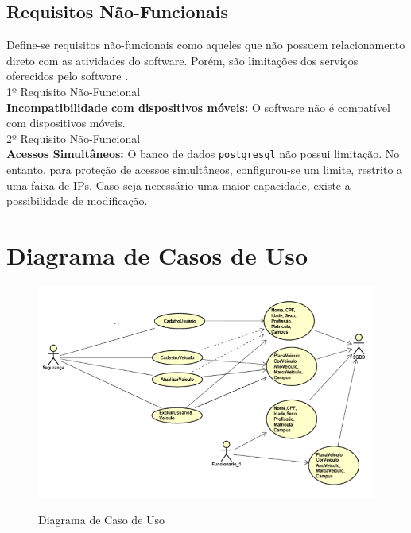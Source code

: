  \subsection{Requisitos Não-Funcionais}
 Define-se requisitos não-funcionais como aqueles que não possuem relacionamento direto com
 as atividades do software. Porém, são limitações dos serviços oferecidos pelo
 software \cite{rezende2006engenharia}.\\
 1º Requisito Não-Funcional\\
 \textbf{Incompatibilidade com dispositivos móveis:}
 O software não é compatível com dispositivos móveis.\\
 2º Requisito Não-Funcional\\
 \textbf{Acessos Simultâneos:}
 O banco de dados \texttt{postgresql} não possui limitação. No entanto, para proteção de acessos simultâneos, configurou-se um limite, restrito a uma faixa de IPs. Caso seja necessário uma maior capacidade, existe a possibilidade de modificação.
 
 \section{Diagrama de Casos de Uso}
 
 
 
 \begin{figure}[h]
 	\caption{Diagrama de Caso de Uso}
 	\centering %
 	\includegraphics{Figs/diagramaCasoUso_proj_vic.png} %
 	\label{figura:diagramaCasoUso_proj_vic}
 \end{figure}
 
